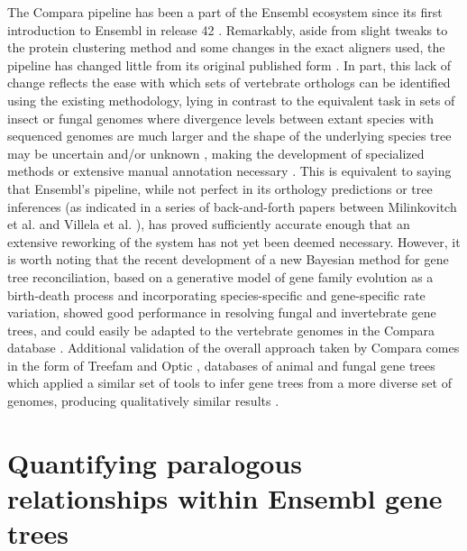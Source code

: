 The Compara pipeline has been a part of the Ensembl ecosystem since
its first introduction to Ensembl in release 42
\citep{Birney2006}. Remarkably, aside from slight tweaks to the
protein clustering method and some changes in the exact aligners used,
the pipeline has changed little from its original published form
\citep{Vilella2009}. In part, this lack of change reflects the ease
with which sets of vertebrate orthologs can be identified using the
existing methodology, lying in contrast to the equivalent task in sets
of insect or fungal genomes where divergence levels between extant
species with sequenced genomes are much larger \citep{Siepel2005} and
the shape of the underlying species tree may be uncertain and/or
unknown \citep{MacKenzie2008a}, making the development of specialized
methods or extensive manual annotation necessary
\citep{Kellis2004,Rasmussen2007}. This is equivalent to saying that
Ensembl's pipeline, while not perfect in its orthology predictions or
tree inferences (as indicated in a series of back-and-forth papers
between Milinkovitch et al. \citeyearpar{Milinkovitch2010} and Villela
et al. \citeyearpar{Vilella2011}), has proved sufficiently accurate
enough that an extensive reworking of the system has not yet been
deemed necessary. However, it is worth noting that the recent
development of a new Bayesian method for gene tree reconciliation,
based on a generative model of gene family evolution as a birth-death
process and incorporating species-specific and gene-specific rate
variation, showed good performance in resolving fungal and
invertebrate gene trees, and could easily be adapted to the vertebrate
genomes in the Compara database . Additional validation of the overall
approach taken by Compara comes in the form of Treefam and Optic
\citep{Ruan2008}, databases of animal and fungal gene trees which
applied a similar set of tools to infer gene trees from a more diverse
set of genomes, producing qualitatively similar results
\citep{Vilella2009}.

\section{Quantifying paralogous relationships within Ensembl gene trees}
\label{section_quantifying_paralogous}


